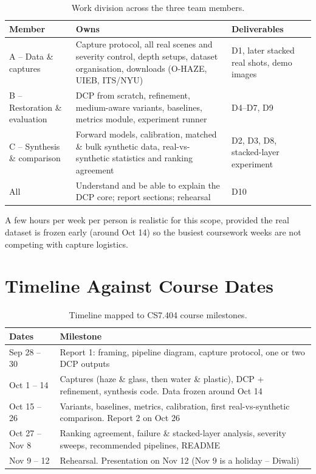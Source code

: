\documentclass[12pt,a4paper]{article}
\begin{document}
\begin{table}[H]
\centering
\normalsize
\begin{tabular}{@{}p{3.0cm}p{7.7cm}p{3.8cm}@{}}
\toprule
Member & Owns & Deliverables \\
\midrule
A -- Data \& captures & Capture protocol, all real scenes and severity
  control, depth setups, dataset organisation, downloads (O-HAZE, UIEB,
  ITS/NYU) & D1, later stacked real shots, demo images \\
B -- Restoration \& evaluation & DCP from scratch, refinement,
  medium-aware variants, baselines, metrics module, experiment runner &
  D4--D7, D9 \\
C -- Synthesis \& comparison & Forward models, calibration, matched \&
  bulk synthetic data, real-vs-synthetic statistics and ranking
  agreement & D2, D3, D8, stacked-layer experiment \\
All & Understand and be able to explain the DCP core; report sections;
  rehearsal & D10 \\
\bottomrule
\end{tabular}
\caption{Work division across the three team members.}
\label{tab:work}
\end{table}

A few hours per week per person is realistic for this scope, provided
the real dataset is frozen early (around Oct 14) so the busiest
coursework weeks are not competing with capture logistics.

\section{Timeline Against Course Dates}
\label{sec:timeline}

\begin{table}[H]
\centering
\normalsize
\begin{tabular}{@{}p{2.8cm}p{11.2cm}@{}}
\toprule
Dates & Milestone \\
\midrule
Sep 28 -- 30 & Report 1: framing, pipeline diagram, capture protocol,
  one or two DCP outputs \\
Oct 1 -- 14 & Captures (haze \& glass, then water \& plastic), DCP +
  refinement, synthesis code. Data frozen around Oct 14 \\
Oct 15 -- 26 & Variants, baselines, metrics, calibration, first
  real-vs-synthetic comparison. Report 2 on Oct 26 \\
Oct 27 -- Nov 8 & Ranking agreement, failure \& stacked-layer analysis,
  severity sweeps, recommended pipelines, README \\
Nov 9 -- 12 & Rehearsal. Presentation on Nov 12 (Nov 9 is a holiday --
  Diwali) \\
\bottomrule
\end{tabular}
\caption{Timeline mapped to CS7.404 course milestones.}
\label{tab:timeline}
\end{table}
\end{document}
